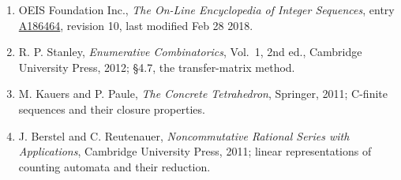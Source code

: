 \documentclass[11pt]{article}
\theoremstyle{definition}
\begin{document}
\begin{enumerate}

\item OEIS Foundation Inc., \emph{The On-Line Encyclopedia of Integer Sequences}, entry \href{https://oeis.org/A186464}{A186464}, revision 10, last modified Feb 28 2018.

\item R. P. Stanley, \emph{Enumerative Combinatorics}, Vol.~1, 2nd ed., Cambridge University Press, 2012; \S4.7, the transfer-matrix method.

\item M. Kauers and P. Paule, \emph{The Concrete Tetrahedron}, Springer, 2011; C-finite sequences and their closure properties.

\item J. Berstel and C. Reutenauer, \emph{Noncommutative Rational Series with Applications}, Cambridge University Press, 2011; linear representations of counting automata and their reduction.

\end{enumerate}
\end{document}
